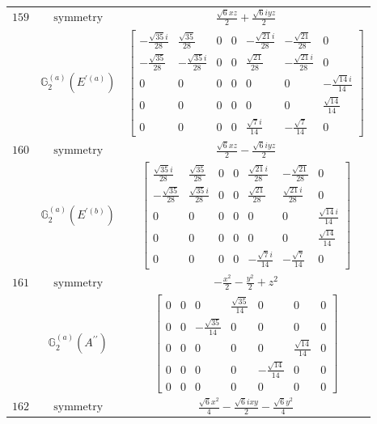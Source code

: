 \documentclass[fleqn,8pt,landscape]{jsarticle}
\begin{document}
\begin{longtable}{ccc}
$ 159 $ & $ \text{symmetry} $ & $ \frac{\sqrt{6} x z}{2} + \frac{\sqrt{6} i y z}{2} $ \\
$  $ & $ \mathbb{G}_{2}^{(a)}(E^{\prime(a)}) $ & $ \begin{bmatrix} - \frac{\sqrt{35} i}{28} & \frac{\sqrt{35}}{28} & 0 & 0 & - \frac{\sqrt{21} i}{28} & - \frac{\sqrt{21}}{28} & 0 \\ - \frac{\sqrt{35}}{28} & - \frac{\sqrt{35} i}{28} & 0 & 0 & \frac{\sqrt{21}}{28} & - \frac{\sqrt{21} i}{28} & 0 \\ 0 & 0 & 0 & 0 & 0 & 0 & - \frac{\sqrt{14} i}{14} \\ 0 & 0 & 0 & 0 & 0 & 0 & \frac{\sqrt{14}}{14} \\ 0 & 0 & 0 & 0 & \frac{\sqrt{7} i}{14} & - \frac{\sqrt{7}}{14} & 0 \end{bmatrix} $ \\ \hline
$ 160 $ & $ \text{symmetry} $ & $ \frac{\sqrt{6} x z}{2} - \frac{\sqrt{6} i y z}{2} $ \\
$  $ & $ \mathbb{G}_{2}^{(a)}(E^{\prime(b)}) $ & $ \begin{bmatrix} \frac{\sqrt{35} i}{28} & \frac{\sqrt{35}}{28} & 0 & 0 & \frac{\sqrt{21} i}{28} & - \frac{\sqrt{21}}{28} & 0 \\ - \frac{\sqrt{35}}{28} & \frac{\sqrt{35} i}{28} & 0 & 0 & \frac{\sqrt{21}}{28} & \frac{\sqrt{21} i}{28} & 0 \\ 0 & 0 & 0 & 0 & 0 & 0 & \frac{\sqrt{14} i}{14} \\ 0 & 0 & 0 & 0 & 0 & 0 & \frac{\sqrt{14}}{14} \\ 0 & 0 & 0 & 0 & - \frac{\sqrt{7} i}{14} & - \frac{\sqrt{7}}{14} & 0 \end{bmatrix} $ \\ \hline
$ 161 $ & $ \text{symmetry} $ & $ - \frac{x^{2}}{2} - \frac{y^{2}}{2} + z^{2} $ \\
$  $ & $ \mathbb{G}_{2}^{(a)}(A^{\prime\prime}) $ & $ \begin{bmatrix} 0 & 0 & 0 & \frac{\sqrt{35}}{14} & 0 & 0 & 0 \\ 0 & 0 & - \frac{\sqrt{35}}{14} & 0 & 0 & 0 & 0 \\ 0 & 0 & 0 & 0 & 0 & \frac{\sqrt{14}}{14} & 0 \\ 0 & 0 & 0 & 0 & - \frac{\sqrt{14}}{14} & 0 & 0 \\ 0 & 0 & 0 & 0 & 0 & 0 & 0 \end{bmatrix} $ \\ \hline
$ 162 $ & $ \text{symmetry} $ & $ \frac{\sqrt{6} x^{2}}{4} - \frac{\sqrt{6} i x y}{2} - \frac{\sqrt{6} y^{2}}{4} $ \\

\end{longtable}
\end{document}

